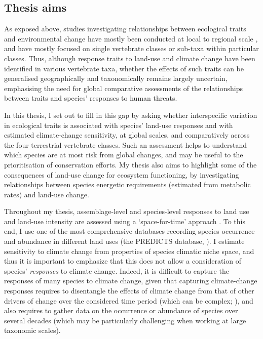 \subsection{Thesis aims}

As exposed above, studies investigating relationships between ecological traits and environmental change have mostly been conducted at local to regional scale \citep{Hevia2017, Davison2021}, and have mostly focused on single vertebrate classes or sub-taxa within particular classes. Thus, although response traits to land-use and climate change have been identified in various vertebrate taxa, whether the effects of such traits can be generalised geographically and taxonomically remains largely uncertain, emphasising the need for global comparative assessments of the relationships between traits and species' responses to human threats. 
 
In this thesis, I set out to fill in this gap by asking whether interspecific variation in ecological traits is associated with species' land-use responses and with estimated climate-change sensitivity, at global scales, and comparatively across the four terrestrial vertebrate classes. Such an assessment helps to understand which species are at most risk from global changes, and may be useful to the prioritisation of conservation efforts. My thesis also aims to highlight some of the consequences of land-use change for ecosystem functioning, by investigating relationships between species energetic requirements (estimated from metabolic rates) and land-use change.

Throughout my thesis, assemblage-level and species-level responses to land use and land-use intensity are assessed using a `space-for-time' approach \citep{DePalma2018}. To this end, I use one of the most comprehensive databases recording species occurrence and abundance in different land uses (the PREDICTS database, \citet{Hudson2014, Hudson2017}). I estimate sensitivity to climate change from properties of species climatic niche space, and thus it is important to emphasize that this does not allow a consideration of species' \textit{responses} to climate change. Indeed, it is difficult to capture the responses of many species to climate change, given that capturing climate-change responses requires to disentangle the effects of climate change from that of other drivers of change over the considered time period (which can be complex; \citet{MacLean2017}), and also requires to gather data on the occurrence or abundance of species over several decades (which may be particularly challenging when working at large taxonomic scales). 


